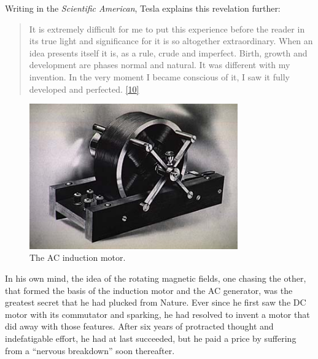\documentclass[
  a4paper,
]{article}
\begin{document}
Writing in the \emph{Scientific American}, Tesla explains this
revelation further:

\begin{quote}
It is extremely difficult for me to put this experience before the
reader in its true light and significance for it is so altogether
extraordinary. When an idea presents itself it is, as a rule, crude and
imperfect. Birth, growth and development are phases normal and natural.
It was different with my invention. In the very moment I became
conscious of it, I saw it fully developed and perfected.
\protect\hyperlink{ref-tesla-personal}{{[}10{]}}
\end{quote}

\begin{figure}
\hypertarget{fig:ac-motor}{%
\centering
\includegraphics[width=0.8\textwidth,height=\textheight]{images/acmot_main02.jpg}
\caption[The AC induction motor.]{The AC induction
motor.\footnotemark{}}\label{fig:ac-motor}
}
\end{figure}

In his own mind, the idea of the rotating magnetic fields, one chasing
the other, that formed the basis of the induction motor and the AC
generator, was the greatest secret that he had plucked from Nature. Ever
since he first saw the DC motor with its commutator and sparking, he had
resolved to invent a motor that did away with those features. After six
years of protracted thought and indefatigable effort, he had at last
succeeded, but he paid a price by suffering from a ``nervous breakdown''
soon thereafter.
\end{document}
